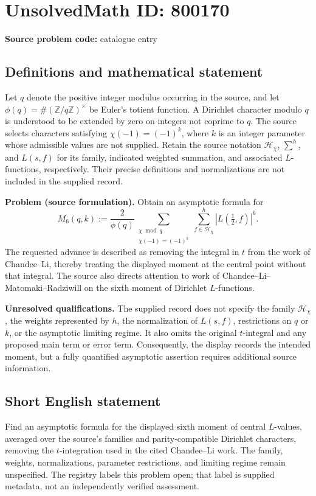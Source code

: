 \documentclass[11pt]{article}
\newcommand{\Z}{\mathbb{Z}}
\begin{document}
\section*{UnsolvedMath ID: 800170}
\textbf{Source problem code:} catalogue entry
\subsection{Definitions and mathematical statement}
Let \(q\) denote the positive integer modulus occurring in the source, and let \(\phi(q)=\#(\Z/q\Z)^\times\) be Euler's totient function. A Dirichlet character modulo \(q\) is understood to be extended by zero on integers not coprime to \(q\). The source selects characters satisfying \(\chi(-1)=(-1)^k\), where \(k\) is an integer parameter whose admissible values are not supplied. Retain the source notation \(\mathcal H_\chi\), \(\sum^h\), and \(L(s,f)\) for its family, indicated weighted summation, and associated \(L\)-functions, respectively. Their precise definitions and normalizations are not included in the supplied record.

\textbf{Problem (source formulation).} Obtain an asymptotic formula for
\[
M_6(q,k):=\frac{2}{\phi(q)}
\sum_{\substack{\chi\bmod q\\ \chi(-1)=(-1)^k}}
\sum_{f\in\mathcal H_\chi}^{h}
\left|L\!\left(\tfrac12,f\right)\right|^6.
\]
The requested advance is described as removing the integral in \(t\) from the work of Chandee--Li, thereby treating the displayed moment at the central point without that integral. The source also directs attention to work of Chandee--Li--Matomaki--Radziwill on the sixth moment of Dirichlet \(L\)-functions.

\textbf{Unresolved qualifications.} The supplied record does not specify the family \(\mathcal H_\chi\), the weights represented by \(h\), the normalization of \(L(s,f)\), restrictions on \(q\) or \(k\), or the asymptotic limiting regime. It also omits the original \(t\)-integral and any proposed main term or error term. Consequently, the display records the intended moment, but a fully quantified asymptotic assertion requires additional source information.
\subsection{Short English statement}
Find an asymptotic formula for the displayed sixth moment of central \(L\)-values, averaged over the source's families and parity-compatible Dirichlet characters, removing the \(t\)-integration used in the cited Chandee--Li work. The family, weights, normalizations, parameter restrictions, and limiting regime remain unspecified. The registry labels this problem open; that label is supplied metadata, not an independently verified assessment.
\end{document}
